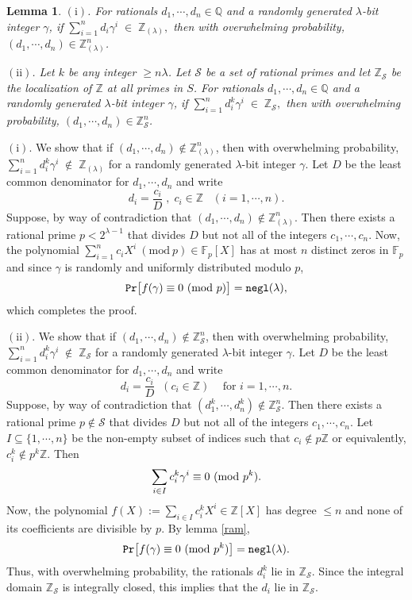 \documentclass[11pt, lettersize, notitlepage, leqno, footskip=0.6cm]{article}
\newcommand{\bz}{\mathbb Z}
\newcommand{\bq}{\mathbb Q}
\newcommand{\bFp}{\mathbb{F}_p}
\newcommand{\slim}{\sum\limits}
\newcommand{\ttt}{\texttt}
\newcommand{\negl}{\ttt{{negl}}}
\newcommand{\mc}{\mathcal}
\newcommand{\mr}{\mathrm}
\newcommand{\lam}{\lambda}
\newcommand{\bzlam}{\bz_{(\lam)}}
\newcommand{\bzs}{\bz_{\mc{S}}}
\newcommand{\sub}{\subseteq}
\newcommand{\vs}{\vspace{-0.15cm}}
\newcommand{\noin}{\noindent}
\newcommand{\op}{overwhelming probability}
\newcommand{\Mod}[1]{\ (\mathrm{mod}\ #1)}
\newtheorem{Lem}[Thm]{Lemma}
\numberwithin{equation}{section}
\begin{document}
\vspace{0.15cm}

\begin{Lem} \label{integers} $\mr{(i)}$. For rationals $d_1,\cdots, d_n\in \bq$ and a randomly generated $\lam$-bit integer $\gamma$, if $\slim_{i=1}^n d_i\gamma^i\; \in \;\bzlam,$ then with \op, $(d_1,\cdots, d_n)\in \bzlam^n$.\vspace{0.1cm}

\noin $\mr{(ii)}$. Let $k$ be any integer $\geq n\lam$. Let $\mc{S}$ be a set of rational primes and let $\bz_{\mc{S}}$ be the localization of $\bz$ at all primes in $S$. For rationals $d_1,\cdots, d_n\in \bq$ and a randomly generated $\lam$-bit integer $\gamma$, if $ \slim_{i=1}^n d_i^{k}\gamma^i\; \in \;\bz_{\mc{S}},$ then with \op, $(d_1,\cdots, d_n)\in \bz_{\mc{S}}^n$.
\end{Lem}

\begin{prf} $\mr{(i)}$. We show that if $(d_1,\cdots,d_n)\notin \bzlam^n$, then with \op, $\sum\limits_{i=1}^n d_i^{k}\gamma^i\; \notin \;\bzlam$ for a randomly generated $\lam$-bit integer $\gamma$. Let $D$ be the least common denominator for $d_1,\cdots, d_n$ and write \vs $$d_i = \frac{c_i}{D}\;,\; c_i\in\bz\; \;\;(i=1,\cdots, n).$$ Suppose, by way of contradiction that $(d_1,\cdots, d_n )\notin \bzlam^n$. Then there exists a rational prime $p < 2^{\lam-1}$ that divides $D$ but not all of the integers $c_1,\cdots,c_n$. Now, the polynomial $\sum_{i=1}^n c_iX^i\Mod{p} \in \bFp[X]$ has at most $n$ distinct zeros in $\bFp$ and since $\gamma$ is randomly and uniformly distributed modulo $p$, \vs $$\ttt{Pr}\big[f(\gamma)\equiv 0\Mod{p} \big] = \negl(\lam),\vs $$ which completes the proof.

\vspace{0.15cm} 

\noin $\mr{(ii)}$. We show that if $(d_1,\cdots,d_n)\notin \bzs^n$, then with \op, $\sum_{i=1}^n d_i^{k}\gamma^i\; \notin \;\bz_{\mc{S}}$ for a randomly generated $\lam$-bit integer $\gamma$. Let $D$ be the least common denominator for $d_1,\cdots, d_n$ and write \vs $$d_i = \frac{c_i}{D}\;\; (c_i\in \bz)\;\;\; \text{ for } i=1,\cdots, n. $$ Suppose, by way of contradiction that $(d_1^{k},\cdots, d_n^{k} )\notin \bz_{\mc{S}}^n$. Then there exists a rational prime $p\notin \mc{S}$ that divides $D$ but not all of the integers $c_1,\cdots,c_n$. Let $I\sub \{1,\cdots,n  \}$ be the non-empty subset of indices such that $c_i\notin p\bz$ or equivalently, $c_i^{k}\notin p^{k}\bz$. Then \vs $$\slim_{i\in I} c_i^{k}\gamma^i \equiv 0\Mod{p^{k}}. \vs $$ Now, the polynomial $f(X):= \slim_{i\in I} c_i^{k} X^i\in \bz[X]$ has degree $\leq n$ and none of its coefficients are divisible by $p$. By lemma \ref{ram}, \vs $$\ttt{Pr}\big[f(\gamma)\equiv 0\Mod{p^{k}} \big] = \negl(\lam).\vs $$ Thus, with \op, the rationals $d_i^{k}$ lie in $\bz_{\mc{S}}$. Since the integral domain $\bz_{\mc{S}}$ is integrally closed, this implies that the $d_i$ lie in $\bz_{\mc{S}}$.\end{prf}
\end{document}
